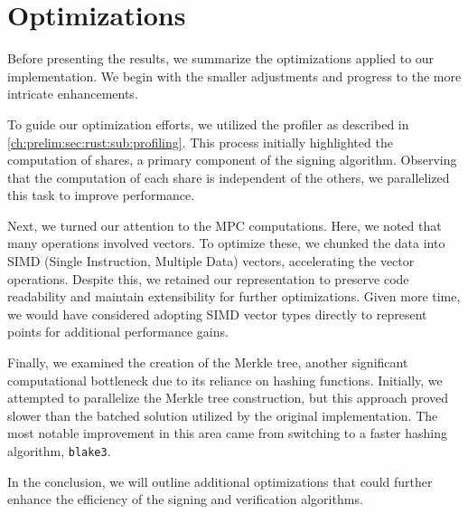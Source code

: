 \documentclass[11pt]{report}
\theoremstyle{definition}
\theoremstyle{plain}
\begin{document}
\section{Optimizations}
Before presenting the results, we summarize the optimizations applied to our implementation. We begin with the smaller adjustments and progress to the more intricate enhancements.

To guide our optimization efforts, we utilized the profiler as described in \autoref{ch:prelim:sec:rust:sub:profiling}. This process initially highlighted the computation of shares, a primary component of the signing algorithm. Observing that the computation of each share is independent of the others, we parallelized this task to improve performance.

Next, we turned our attention to the MPC computations. Here, we noted that many operations involved vectors. To optimize these, we chunked the data into SIMD (Single Instruction, Multiple Data) vectors, accelerating the vector operations. Despite this, we retained our  representation to preserve code readability and maintain extensibility for further optimizations. Given more time, we would have considered adopting SIMD vector types directly to represent points for additional performance gains.

Finally, we examined the creation of the Merkle tree, another significant computational bottleneck due to its reliance on hashing functions. Initially, we attempted to parallelize the Merkle tree construction, but this approach proved slower than the batched solution utilized by the original implementation. The most notable improvement in this area came from switching to a faster hashing algorithm, \texttt{blake3}.

In the conclusion, we will outline additional optimizations that could further enhance the efficiency of the signing and verification algorithms.
\end{document}

